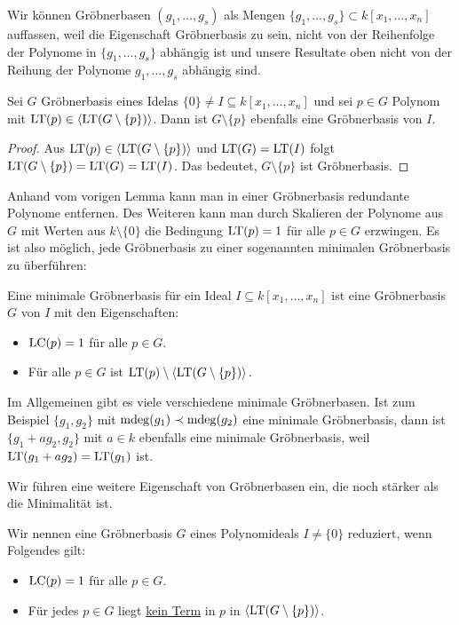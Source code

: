 \documentclass[11pt]{article}
\numberwithin{equation}{section}
\begin{document}
\begin{remark}
	Wir können Gröbnerbasen $(g_1,\ldots,g_s)$ als Mengen $\{g_1,\ldots,g_s\} \subset k[x_1,\ldots,x_n]$ auffassen, weil die Eigenschaft Gröbnerbasis zu sein, nicht von der Reihenfolge der Polynome in $\{g_1,\ldots,g_s\}$ abhängig ist und unsere Resultate oben nicht von der Reihung der Polynome $g_1,\ldots,g_s$ abhängig sind. 
\end{remark} 

\begin{lemma}
	Sei $G$ Gröbnerbasis eines Idelas $\{0\} \ne I \subseteq k[x_1,\ldots,x_n]$ und sei $p \in G$ Polynom mit $\operatorname{LT}(p) \in \left< \operatorname{LT}(G \setminus \{p\}) \right>$. Dann ist $G \setminus \{p\}$ ebenfalls eine Gröbnerbasis von $I$. 
\end{lemma} 
\begin{proof} 
	Aus $\operatorname{LT}(p) \in \left< \operatorname{LT}(G \setminus \{p\}) \right>$ und $\operatorname{LT}(G) = \operatorname{LT}(I)$ folgt $\operatorname{LT}( G \setminus \{p\}) = \operatorname{LT}(G) = \operatorname{LT}(I)$. Das bedeutet, $G \setminus \{p\}$ ist Gröbnerbasis. 
\end{proof} 

Anhand vom vorigen Lemma kann man in einer Gröbnerbasis redundante Polynome entfernen. Des Weiteren kann man durch Skalieren der Polynome aus $G$ mit Werten aus $k \setminus \{0\}$ die Bedingung $\operatorname{LT}(p)=1$ für alle $p \in G$ erzwingen. Es ist also möglich, jede Gröbnerbasis zu einer sogenannten minimalen Gröbnerbasis zu überführen: 

\begin{definition} 
	Eine minimale Gröbnerbasis für ein Ideal $I \subseteq k[x_1,\ldots,x_n]$ ist eine Gröbnerbasis $G$ von $I$ mit den Eigenschaften: 
	\begin{itemize} 
			\item $\operatorname{LC}(p)=1$ für alle $p \in G$. 
			\item Für alle $p \in G$ ist $\operatorname{LT}(p) \setminus \left< \operatorname{LT}(G \setminus \{p\}) \right>.$ 
	\end{itemize} 
\end{definition} 

Im Allgemeinen gibt es viele verschiedene minimale Gröbnerbasen. Ist zum Beispiel $\{g_1,g_2\}$ mit $\operatorname{mdeg}(g_1) \prec \operatorname{mdeg}(g_2)$ eine minimale Gröbnerbasis, dann ist $\{ g_1 + a g_2, g_2\}$ mit $a \in k$ ebenfalls eine minimale Gröbnerbasis, weil $\operatorname{LT}(g_1 + a g_2) = \operatorname{LT}(g_1) $ ist. 

Wir führen eine weitere Eigenschaft von Gröbnerbasen ein, die noch stärker als die Minimalität ist. 

\begin{definition} 
	Wir nennen eine  Gröbnerbasis $G$ eines Polynomideals $I \ne \{0\}$ reduziert, wenn Folgendes gilt: 
	\begin{itemize} 
		\item $\operatorname{LC}(p) = 1$ für alle $p \in G$. 
		\item Für jedes $p \in G$ liegt \underline{kein Term} in $p$ in $\left< \operatorname{LT}(G \setminus \{p\}) \right>$. 
	\end{itemize} 
\end{definition}
\end{document}
